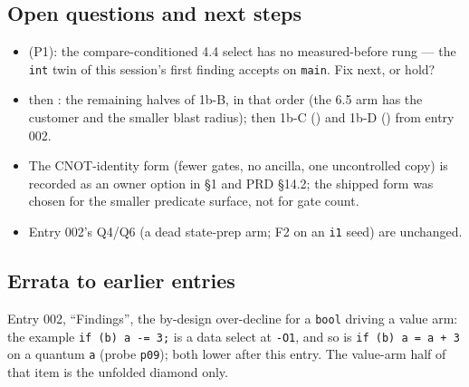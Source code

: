 \subsection*{Open questions and next steps}
\begin{itemize}
  \item {} (P1): the compare-conditioned 4.4 select has no measured-before rung --- the
    \texttt{int} twin of this session's first finding accepts on \texttt{main}. Fix next, or hold?
  \item {} then : the remaining halves of 1b-B, in that order (the 6.5 arm has the
    customer and the smaller blast radius); then 1b-C () and 1b-D () from entry 002.
  \item The CNOT-identity form (fewer gates, no ancilla, one uncontrolled copy) is recorded as an owner
    option in  \S1 and PRD \S14.2; the shipped form was chosen for the smaller
    predicate surface, not for gate count.
  \item Entry 002's Q4/Q6 (a dead state-prep arm; F2 on an \texttt{i1} seed) are unchanged.
\end{itemize}

\subsection*{Errata to earlier entries}
Entry 002, ``Findings'', the by-design over-decline for a \texttt{bool} driving a value arm: the
example \texttt{if (b) a -= 3;} is a data select at \texttt{-O1}, and so is \texttt{if (b) a = a + 3}
on a quantum \texttt{a} (probe \texttt{p09}); both lower after this entry. The value-arm half of that
item is the unfolded diamond only.
